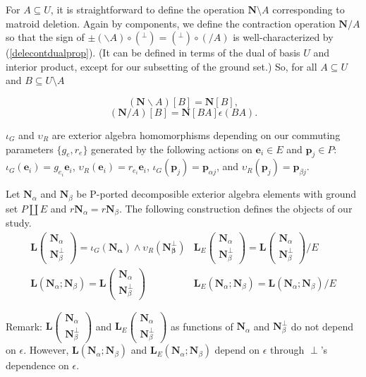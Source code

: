 \documentclass[Unicode]{cedram-alco}
\newcommand{\ext}[1]{\ensuremath{\mathbf{#1}}}
\newcommand{\eNal}{\ensuremath{\ext{N}_{\alpha}}}
\newcommand{\eNbePe}{\ensuremath{\ext{N}_{\beta}^{\perp}}}
\newcommand{\eNbe}{\ensuremath{\ext{N}_\beta}}
\newcommand{\Is}{\ensuremath{\iota}}
\newcommand{\Vs}{\ensuremath{\upsilon}}
\newcommand{\dunion}{\coprod}
\newcommand{\extLVert}[2]{\ext{L}\left( \begin{array}{c} {#1}\\ {#2} \end{array} \right)}
\newcommand{\LVert}[2]{\ext{L}\left( \begin{array}{c} {#1}\\ {#2} \end{array} \right)}
\newcommand{\LVertSub}[3]{\ext{L}_{#1}\left( \begin{array}{c} {#2}\\ {#3} \end{array} \right)}
\newcommand{\LHor}[2]{\ext{L}\left( {#1}; {#2} \right)}
\newcommand{\LHorSub}[3]{\ext{L}_{#1}\left(  {#2}; {#3}  \right)}
\begin{document}
For $A\subseteq U$, it is straightforward to
define the operation $\ext{N}\setminus A$ corresponding to matroid
deletion.  Again by components, we define the 
contraction operation $\ext{N}/A$
so that the sign of $\pm(\backslash A)\circ(^\perp)=(^\perp)\circ(/ A)$
is well-characterized by (\ref{delecontdualprop}).  (It can be
defined in terms
of the dual of basis $U$ and interior product\cite{MarcusFDMuAlPt2},
except for our
subsetting of the ground set.) So, for all $A\subseteq U$ and
$B\subseteq U \setminus A$
\begin{defi}\label{extmatdefs}
  \begin{equation}\label{deletion-definition}
  (\ext{N}\backslash A)[B] = \ext{N}[B],
\end{equation}
\begin{equation}\label{contraction-definition}
  (\ext{N}/A)[B] = \ext{N}[BA]\epsilon(BA).
\end{equation}
\end{defi}


\begin{defi}\label{iGvRdefs}
  $\Is_G$ and $\Vs_R$ are exterior algebra homomorphisms depending on our commuting parameters
  $\{g_e, r_e\}$ generated by
  the following actions on $\ext{e}_i\in E$ and $\ext{p}_j\in P$:
  $\Is_G(\ext{e}_i)= g_{e_i}\ext{e}_i$, $\Vs_R(\ext{e}_i)=r_{e_i}\ext{e}_i$,
  $\Is_G(\ext{p}_j)=\ext{p}_{\alpha j}$, and   $\Vs_R(\ext{p}_j)=\ext{p}_{\beta j}$.
\end{defi}

\begin{defi}\label{LDefs}
  Let $\ext{N}_\alpha$ and $\ext{N}_\beta$ be P-ported decomposible exterior algebra elements
  with ground set $P\dunion E$ and $r\ext{N}_\alpha=r\ext{N}_\beta$.
  The following construction defines the objects of our study.
  \begin{equation}
  \begin{array}{cc}
    \LVert{\eNal}{\eNbePe} = \Is_G(\ext{N_\alpha})\wedge\Vs_R(\ext{N_{\beta}^\perp}) &
    \LVertSub{E}{\eNal}{\eNbePe} = \LVert{\eNal}{\eNbePe}/E\\
    \LHor{\eNal}{\eNbe}=\extLVert{\eNal}{\eNbePe} &
    \LHorSub{E}{\eNal}{\eNbe}=\LHor{\eNal}{\eNbe}/E
  \end{array}
  \end{equation}
\end{defi}


Remark: $\LVert{\eNal}{\eNbePe}$ and $\LVertSub{E}{\eNal}{\eNbePe}$ as functions of
$\eNal$ and $\eNbePe$ do not depend on $\epsilon$.  However, $\LHor{\eNal}{\eNbe}$
and $\LHorSub{E}{\eNal}{\eNbe}$ depend on $\epsilon$ through $\perp$'s dependence
on $\epsilon$.  
\end{document}
